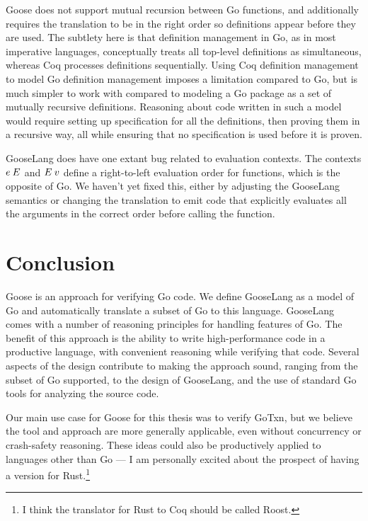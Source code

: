 Goose does not support mutual recursion between Go functions, and
additionally requires the translation to be in the right order so
definitions appear before they are used. The subtlety here is that
definition management in Go, as in most imperative languages,
conceptually treats all top-level definitions as simultaneous, whereas
Coq processes definitions sequentially. Using Coq definition management
to model Go definition management imposes a limitation compared to Go,
but is much simpler to work with compared to modeling a Go package as a
set of mutually recursive definitions. Reasoning about code written in such a
model would require setting up specification for all the definitions, then
proving them in a recursive way, all while ensuring that no specification is
used before it is proven.

GooseLang does have one extant bug related to evaluation contexts. The contexts
$e \: E$ and $E \: v$ define a right-to-left evaluation order for functions,
which is the opposite of Go. We haven't yet fixed this, either by adjusting the
GooseLang semantics or changing the translation to emit code that explicitly
evaluates all the arguments in the correct order before calling the function.


\section{Conclusion}

Goose is an approach for verifying Go code. We define GooseLang as a model of Go
and automatically translate a subset of Go to this language. GooseLang comes
with a number of reasoning principles for handling features of Go. The benefit
of this approach is the ability to write high-performance code in a
productive language, with convenient reasoning while verifying
that code. Several aspects of the design contribute to making the approach
sound, ranging from the subset of Go supported, to the design of GooseLang, and
the use of standard Go tools for analyzing the source code.

Our main use case for Goose for this thesis was to verify GoTxn, but we believe
the tool and approach are more generally applicable, even without concurrency or
crash-safety reasoning. These ideas could also be productively applied to
languages other than Go --- I am personally excited about the prospect of having
a version for Rust.\footnote{I think the translator for Rust to Coq should be
called Roost.}
